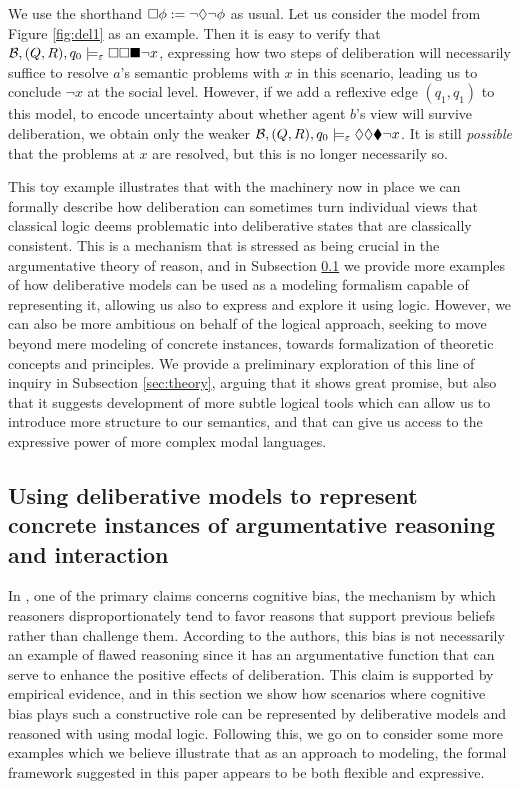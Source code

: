 \documentclass[greybox]{svmult}
\newcommand{\views}{\mathcal B}
\newcommand{\sem}{\varepsilon}
\begin{document}
We use the shorthand $\square \phi := \neg \lozenge \neg \phi$ as usual. Let us consider the model from Figure \ref{fig:del1} as an example. Then it is easy to verify that $\views, (Q,R), q_0 \models_\sem \abox \abox \cbox \neg x$, expressing how two steps of deliberation will necessarily suffice to resolve $a$'s semantic problems with $x$ in this scenario, leading us to conclude $\neg x$ at the social level. However, if we add a reflexive edge $(q_1,q_1)$ to this model, to encode uncertainty about whether agent $b$'s view will survive deliberation, we obtain only the weaker $\views, (Q,R),q_0 \models_\sem \adia \adia \cdia \neg x$. It is still \emph{possible} that the problems at $x$ are resolved, but this is no longer necessarily so.

This toy example illustrates that with the machinery now in place we can formally describe how deliberation can sometimes turn individual views that classical logic deems problematic into deliberative states that are classically consistent. This is a mechanism that is stressed as being crucial in the argumentative theory of reason, and in Subsection \ref{sec:examples} we provide more examples of how deliberative models can be used as a modeling formalism capable of representing it, allowing us also to express and explore it using logic. However, we can also be more ambitious on behalf of the logical approach, seeking to move beyond mere modeling of concrete instances, towards formalization of theoretic concepts and principles. We provide a preliminary exploration of this line of inquiry in Subsection \ref{sec:theory}, arguing that it shows great promise, but also that it suggests development of more subtle logical tools which can allow us to introduce more structure to our semantics, and that can give us access to the expressive power of more complex modal languages. 

\subsection{Using deliberative models to represent concrete instances of argumentative reasoning and interaction}\label{sec:examples}

In \cite{whyreason}, one of the primary claims concerns cognitive bias, the mechanism by which reasoners disproportionately tend to favor reasons that support previous beliefs rather than challenge them. According to the authors, this bias is not necessarily an example of flawed reasoning since it has an argumentative function that can serve to enhance the positive effects of deliberation. This claim is supported by empirical evidence, and in this section we show how scenarios where cognitive bias plays such a constructive role can be represented by deliberative models and reasoned with using modal logic. Following this, we go on to consider some more examples which we believe illustrate that as an approach to modeling, the formal framework suggested in this paper appears to be both flexible and expressive. 
\end{document}
